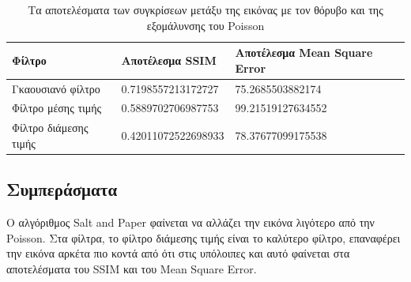\begin{table}
	\begin{tabular}{| p{2cm} | p{7cm} | p{6.5cm} |}
	\hline
	\textbf{Φίλτρο} & \textbf{Αποτέλεσμα SSIM} & \textbf{Αποτέλεσμα Mean Square Error} \\
	\hline
	Γκαουσιανό φίλτρο & 0.7198557213172727 & 75.2685503882174 \\
	\hline
	Φίλτρο μέσης τιμής & 0.5889702706987753 & 99.21519127634552 \\
	\hline
	Φίλτρο διάμεσης τιμής & 0.42011072522698933 & 78.37677099175538 \\
	\hline
	\end{tabular}
	\label{tab:results_poisson_noise}
	\caption{Τα αποτελέσματα των συγκρίσεων μετάξυ της εικόνας με τον θόρυβο και της εξομάλυνσης του Poisson}
\end{table}

\newpage
\subsection{Συμπεράσματα}

Ο αλγόριθμος Salt and Paper φαίνεται να αλλάζει την εικόνα λιγότερο από την Poisson. 
Στα φίλτρα, το φίλτρο διάμεσης τιμής είναι το καλύτερο φίλτρο, επαναφέρει την εικόνα αρκέτα πιο κοντά από ότι στις υπόλοιπες και αυτό φαίνεται στα αποτελέσματα του SSIM και του Mean Square Error.
